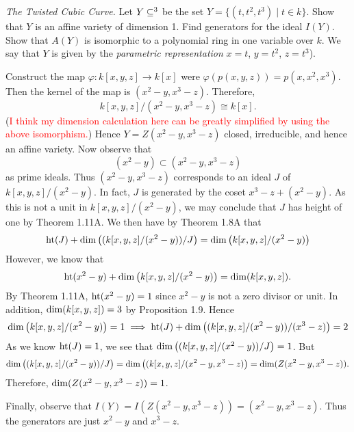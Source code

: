 \documentclass{hw_pset} %
\DeclareMathOperator{\Ht}{\rm{ht}}    %
\DeclareMathOperator{\Dim}{\rm{dim}}  %
\let\aa\relax
\DeclareMathOperator{\aa}{\mathbf{A}} %
\renewcommand{\phi}{\varphi}
\newcommand{\note}[1]{\textcolor{red}{#1}}
\begin{document}
\begin{exercise}[1.2]
    \emph{The Twisted Cubic Curve.}
    Let $Y \subseteq \aa^3$ be the set $Y = \{(t,t^2,t^3) \mid t \in k\}$.
    Show that $Y$ is an affine variety of dimension 1. Find generators 
    for the ideal $I(Y)$. Show that $A(Y)$ is isomorphic to a polynomial ring 
    in one variable over $k$. We say that $Y$ is given by the \emph{parametric representation} 
    $x = t$, $y = t^2$, $z = t^3$). 
\end{exercise}

\begin{solution}
    Construct the map $\phi: k[x,y,z] \to k[x]$ were 
    $\phi(p(x, y, z)) = p(x, x^2, x^3)$. Then the kernel of the 
    map is $(x^2 - y, x^3 - z)$. Therefore, 
    \[
        k[x,y,z]/(x^2 - y, x^3 - z) \cong k[x]. 
    \]
    (\note{I think my dimension calculation here can be greatly simplified by using the above isomorphism.})
    Hence $Y = Z(x^2 -y, x^3 - z)$ closed, irreducible, and hence an affine 
    variety. 
    Now observe that 
    \[
        (x^2 - y) \subset (x^2 - y, x^3 - z)
    \]
    as prime ideals. Thus $(x^2 - y, x^3 - z)$ corresponds to 
    an ideal $J$ of $k[x,y,z]/(x^2 - y)$. In fact, $J$ is generated by 
    the coset $x^3 - z + (x^2 - y)$. As this is not a unit in $k[x,y,z]/(x^2 - y)$, 
    we may conclude that $J$ has height of one by Theorem 1.11A. We then have by 
    Theorem 1.8A that 
    \[
        \Ht(J) + \Dim\left( (k[x,y,z]/(x^2 - y))/J \right) = \Dim\left( k[x,y,z]/(x^2 - y) \right)
    \]
    However, we know that 
    \[
        \Ht(x^2 - y) + \Dim\left( k[x,y,z]/(x^2 - y) \right) = \Dim( k[x,y,z]).
    \]
    By Theorem 1.11A, $\Ht(x^2 - y) = 1$ since $x^2 - y$ is not a zero divisor or unit.
    In addition, $\Dim(k[x,y,z]) = 3$ by Proposition 1.9. Hence 
    \[
        \Dim\left( k[x,y,z]/(x^2 - y) \right) = 1 \implies 
        \Ht(J) + \Dim\left( (k[x,y,z]/(x^2 - y))/(x^3 - z) \right)
        = 2
    \]
    As we know $\Ht(J) = 1$, we see that 
    $\Dim\left( (k[x,y,z]/(x^2 - y))/J \right) = 1$. 
    But 
    \[
        \Dim\left( (k[x,y,z]/(x^2 - y))/J \right) = 
        \Dim\left( (k[x,y,z]/(x^2 - y, x^3 - z) \right) 
        = \Dim(Z(x^2 - y, x^3 - z)).
    \]
    Therefore, $\Dim(Z(x^2 - y, x^3 - z)) = 1$. 

    Finally, observe that $I(Y) = I(Z(x^2-y, x^3 - z)) = (x^2 - y, x^3 - z)$. 
    Thus the generators are just $x^2 - y$ and $x^3 - z$. 




\end{solution}
\end{document}
